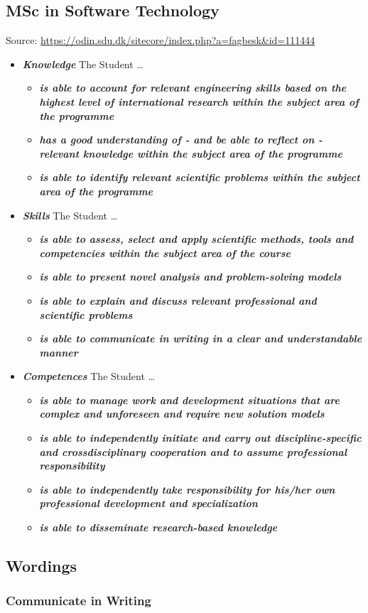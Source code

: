 \documentclass[a4paper, oneside]{memoir}
\newcommand{\textdesc}[1]{\textit{\textbf{#1}}}
\newcommand{\descitem}[1]{\item \textdesc{#1}}
\begin{document}
\subsection{MSc in Software Technology}
Source: \url{https://odin.sdu.dk/sitecore/index.php?a=fagbesk&id=111444}
\begin{itemize}
  \descitem{Knowledge} The Student \ldots
    \begin{itemize}
      \descitem{is able to account for relevant engineering skills based on the highest level of international research within the subject area of the programme}
      \descitem{has a good understanding of - and be able to reflect on - relevant knowledge within the subject area of the programme}
      \descitem{is able to identify relevant scientific problems within the subject area of the programme}
    \end{itemize}
  \descitem{Skills} The Student \ldots
    \begin{itemize}
      \descitem{is able to assess, select and apply scientific methods, tools and competencies within the subject area of the course}
      \descitem{is able to present novel analysis and problem-solving models}
      \descitem{is able to explain and discuss relevant professional and scientific problems}
      \descitem{is able to communicate in writing in a clear and understandable manner}
    \end{itemize}
  \descitem{Competences} The Student \ldots
    \begin{itemize}
      \descitem{is able to manage work and development situations that are complex and unforeseen and require new solution models}
      \descitem{is able to independently initiate and carry out discipline-specific and crossdisciplinary cooperation and to assume professional responsibility}
      \descitem{is able to independently take responsibility for his/her own professional development and specialization}
      \descitem{is able to disseminate research-based knowledge}
    \end{itemize}
\end{itemize}

\subsection{Wordings}

\subsubsection{Communicate in Writing}
\end{document}
